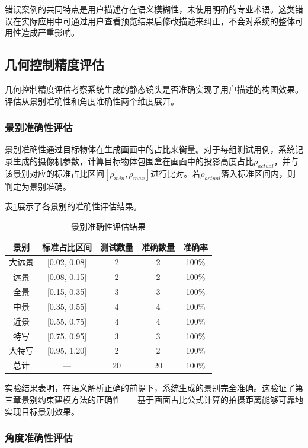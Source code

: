 错误案例的共同特点是用户描述存在语义模糊性，未使用明确的专业术语。这类错误在实际应用中可通过用户查看预览结果后修改描述来纠正，不会对系统的整体可用性造成严重影响。

\subsection{几何控制精度评估}

几何控制精度评估考察系统生成的静态镜头是否准确实现了用户描述的构图效果。评估从景别准确性和角度准确性两个维度展开。

\subsubsection{景别准确性评估}

景别准确性通过目标物体在生成画面中的占比来衡量。对于每组测试用例，系统记录生成的摄像机参数，计算目标物体包围盒在画面中的投影高度占比$\rho_{actual}$，并与该景别对应的标准占比区间$[\rho_{min}, \rho_{max}]$进行比对。若$\rho_{actual}$落入标准区间内，则判定为景别准确。

表\ref{tab:shot_scale_accuracy}展示了各景别的准确性评估结果。

\begin{table}[htbp]
\centering
\caption{景别准确性评估结果}
\label{tab:shot_scale_accuracy}
\begin{tabular}{ccccc}
\toprule
景别 & 标准占比区间 & 测试数量 & 准确数量 & 准确率 \\
\midrule
大远景 & [0.02, 0.08] & 2 & 2 & 100\% \\
远景 & [0.08, 0.15] & 2 & 2 & 100\% \\
全景 & [0.15, 0.35] & 3 & 3 & 100\% \\
中景 & [0.35, 0.55] & 4 & 4 & 100\% \\
近景 & [0.55, 0.75] & 4 & 4 & 100\% \\
特写 & [0.75, 0.95] & 3 & 3 & 100\% \\
大特写 & [0.95, 1.20] & 2 & 2 & 100\% \\
\midrule
总计 & — & 20 & 20 & 100\% \\
\bottomrule
\end{tabular}
\end{table}

实验结果表明，在语义解析正确的前提下，系统生成的景别完全准确。这验证了第三章景别约束建模方法的正确性——基于画面占比公式计算的拍摄距离能够可靠地实现目标景别效果。

\subsubsection{角度准确性评估}

